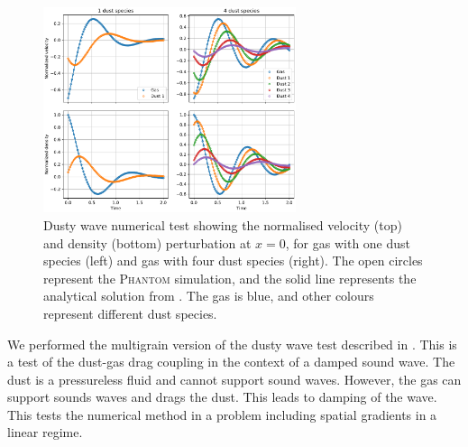 \documentclass[fleqn,usenatbib]{mnras}
\begin{document}
\begin{figure}
   \begin{center}
      \includegraphics[width=0.66\textwidth]{figs/dustywave_velocity_density.pdf}
      \caption{Dusty wave numerical test showing the normalised velocity (top)
         and density (bottom) perturbation at \(x = 0\), for gas with one dust
         species (left) and gas with four dust species (right). The open circles
         represent the \textsc{Phantom} simulation, and the solid line
         represents the analytical solution from
         \citet{Benitez-Llambay2019ApJS..241...25B}. The gas is blue, and other
         colours represent different dust species.%
         \label{fig:dustywave}}
   \end{center}
\end{figure}

We performed the multigrain version of the dusty wave test described in
\citet{Laibe2011MNRAS.418.1491L, Laibe2014MNRAS.444.1940L}. This is a test of
the dust-gas drag coupling in the context of a damped sound wave. The dust is a
pressureless fluid and cannot support sound waves. However, the gas can support
sounds waves and drags the dust. This leads to damping of the wave. This tests
the numerical method in a problem including spatial gradients in a linear
regime.
\end{document}
